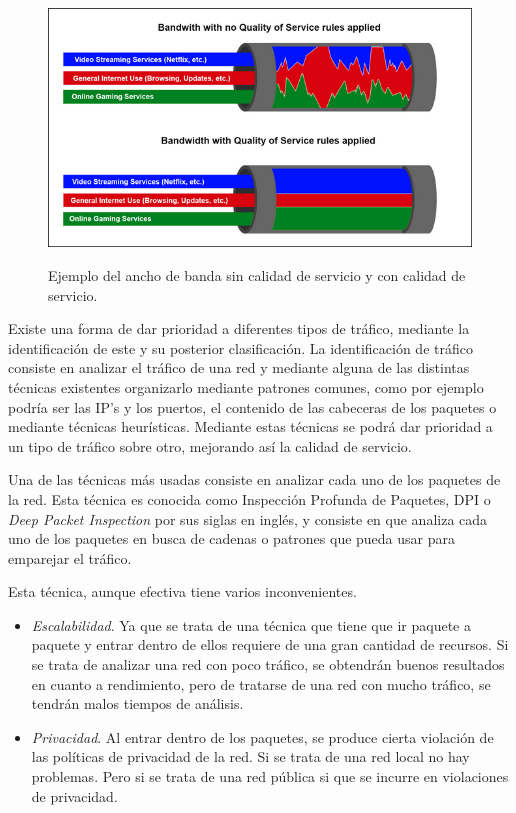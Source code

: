 \begin{figure}[H]
  \includegraphics[width=1\textwidth]{imagenes/calidadservicio.png}\label{Figura 1}
  \centering
  \caption{Ejemplo del ancho de banda sin calidad de servicio y con calidad de servicio.}
\end{figure}

\intro Existe una forma de dar prioridad a diferentes tipos de tráfico, mediante la identificación de este y su posterior 
clasificación. La identificación de tráfico consiste en analizar el tráfico de una red y mediante alguna de las distintas 
técnicas existentes organizarlo mediante patrones comunes, como por ejemplo podría ser las IP's y los puertos, el contenido de las 
cabeceras de los paquetes o mediante técnicas heurísticas. Mediante estas técnicas se podrá dar prioridad a un tipo 
de tráfico sobre otro, mejorando así la calidad de servicio.

\intro Una de las técnicas más usadas consiste en analizar cada uno de los paquetes de la red. Esta técnica es conocida como 
Inspección Profunda de Paquetes, DPI o \textit{Deep Packet Inspection} \cite{dpiaproximacion} por sus siglas en inglés, 
y consiste en que analiza cada uno de los paquetes en busca de cadenas o patrones que pueda usar para emparejar el tráfico.

\intro Esta técnica, aunque efectiva tiene varios inconvenientes.
\begin{itemize}
\item \textit{Escalabilidad}. Ya que se trata de una técnica que tiene que ir paquete a paquete y entrar dentro de ellos requiere de 
una gran cantidad de recursos. Si se trata de analizar una red con poco tráfico, se obtendrán buenos resultados en cuanto a 
rendimiento, pero de tratarse de una red con mucho tráfico, se tendrán malos tiempos de análisis.
\item \textit{Privacidad}. Al entrar dentro de los paquetes, se produce cierta violación de las políticas de privacidad de la red. Si 
se trata de una red local no hay problemas. Pero si se trata de una red pública si que se incurre en violaciones de privacidad.
\end{itemize}

